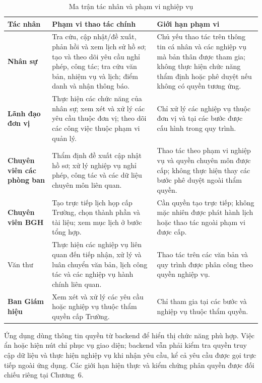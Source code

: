 \begin{table}[H]
\centering
\small
\caption{Ma trận tác nhân và phạm vi nghiệp vụ}
\label{tab:actor_function_matrix}
\begin{tabularx}{\textwidth}{|>{\raggedright\arraybackslash\bfseries}p{3.1cm}|>{\raggedright\arraybackslash}X|>{\raggedright\arraybackslash}X|}
\hline
\textbf{Tác nhân} & \textbf{Phạm vi thao tác chính} & \textbf{Giới hạn phạm vi} \\
\hline
Nhân sự & Tra cứu, cập nhật/đề xuất, phản hồi và xem lịch sử hồ sơ; tạo và theo dõi yêu cầu nghỉ phép, công tác; tra cứu văn bản, nhiệm vụ và lịch; điểm danh và nhận thông báo. & Chủ yếu thao tác trên thông tin cá nhân và các nghiệp vụ mà bản thân được tham gia; không thực hiện chức năng thẩm định hoặc phê duyệt nếu không có quyền tương ứng. \\
\hline
Lãnh đạo đơn vị & Thực hiện các chức năng của nhân sự; xem xét và xử lý các yêu cầu thuộc đơn vị; theo dõi các công việc thuộc phạm vi quản lý. & Chỉ xử lý các nghiệp vụ thuộc đơn vị và tại các bước được cấu hình trong quy trình. \\
\hline
Chuyên viên các phòng ban & Thẩm định đề xuất cập nhật hồ sơ; xử lý nghiệp vụ nghỉ phép, công tác và các dữ liệu chuyên môn liên quan. & Thao tác theo phạm vi nghiệp vụ và quyền chuyên môn được cấp; không thực hiện thay các bước phê duyệt ngoài thẩm quyền. \\
\hline
Chuyên viên BGH & Tạo trực tiếp lịch họp cấp Trường, chọn thành phần và tài liệu; xem mục lịch ở bước tổng hợp. & Cần quyền tạo trực tiếp; không mặc nhiên được phát hành lịch hoặc thao tác ngoài phạm vi được cấp. \\
\hline

Văn thư & Thực hiện các nghiệp vụ liên quan đến tiếp nhận, xử lý và luân chuyển văn bản, lịch công tác và các nghiệp vụ hành chính liên quan. & Thao tác trên các văn bản và quy trình được phân công theo quyền nghiệp vụ. \\
\hline
Ban Giám hiệu & Xem xét và xử lý các yêu cầu hoặc nghiệp vụ thuộc thẩm quyền cấp Trường. & Chỉ tham gia tại các bước và nghiệp vụ thuộc thẩm quyền. \\
\hline
\end{tabularx}
\end{table}

Ứng dụng dùng thông tin quyền từ backend để hiển thị chức năng phù hợp. Việc ẩn hoặc hiện nút chỉ phục vụ giao diện; backend vẫn phải kiểm tra quyền truy cập dữ liệu và thực hiện nghiệp vụ khi nhận yêu cầu, kể cả yêu cầu được gọi trực tiếp ngoài ứng dụng. Các giới hạn hiện thực và kiểm chứng phân quyền được đối chiếu riêng tại Chương~6.

